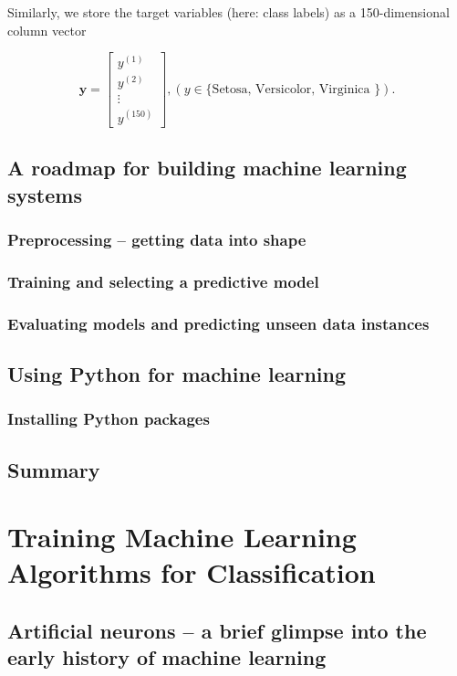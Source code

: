\documentclass[letterpaper]{report}
\begin{document}
Similarly, we store the target variables (here: class labels) as a 150-dimensional column vector

\[
\mathbf{y} = \begin{bmatrix}
    y^{(1)}  \\
    y^{(2)}  \\
    \vdots  \\
    y^{(150)}
\end{bmatrix}
, (y \in \{ \text{Setosa, Versicolor, Virginica \}}).\]

\newpage

\section{A roadmap for building machine learning systems}
\subsection{Preprocessing -- getting data into shape}
\subsection{Training and selecting a predictive model}
\subsection{Evaluating models and predicting unseen data instances}
\section{Using Python for machine learning}
\subsection{Installing Python packages}
\section{Summary}










\chapter{Training Machine Learning Algorithms for Classification}

\section{Artificial neurons -- a brief glimpse into the early history of machine learning}
\end{document}
